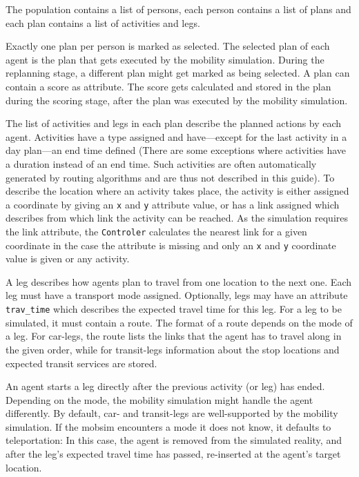 The population contains a list of persons, each person contains a list of plans and each plan contains a list of activities and legs.

Exactly one plan per person is marked as selected. The selected plan of each agent is the plan that gets executed by the mobility simulation. During the replanning stage, a different plan might get marked as being selected. A plan can contain a score as attribute. The score gets calculated and stored in the plan during the scoring stage, after the plan was executed by the mobility simulation.

The list of activities and legs in each plan describe the planned actions by each agent. Activities have a type assigned and have---except for the last activity in a day plan---an end time defined (There are some exceptions where activities have a duration instead of an end time. Such activities are often automatically generated by routing algorithms and are thus not described in this guide). To describe the location where an activity takes place, the activity is either assigned a coordinate by giving an \lstinline|x| and \lstinline|y| attribute value, or has a link assigned which describes from which link the activity can be reached. As the simulation requires the link attribute, the \lstinline|Controler| calculates the nearest link for a given coordinate in the case the attribute is missing and only an \lstinline|x| and \lstinline|y| coordinate value is given or any activity.

A \gls{leg} describes how agents plan to travel from one location to the next one. Each leg must have a transport mode assigned. Optionally, legs may have an attribute \lstinline|trav_time| which describes the expected travel time for this leg. For a leg to be simulated, it must contain a route. The format of a route depends on the mode of a leg. For car-legs, the route lists the links that the agent has to travel along in the given order, while for transit-legs information about the stop locations and expected transit services are stored.

An agent starts a leg directly after the previous activity (or leg) has ended. Depending on the mode, the mobility simulation might handle the agent differently. By default, car- and transit-legs are well-supported by the mobility simulation. If the \gls{mobsim} encounters a mode it does not know, it defaults to teleportation: In this case, the agent is removed from the simulated reality, and after the leg's expected travel time has passed, re-inserted at the agent's target location.

